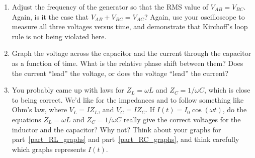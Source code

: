 \begin{enumerate}[wide]
\item Adjust the frequency of the generator so that the RMS value of $V_{AB} = V_{BC}$.   Again, is it the case that $V_{AB} + V_{BC} = V_{AC}$?  Again, use your oscilloscope to measure all three voltages versus time, and demonstrate that Kirchoff's loop rule is not being violated here.  

\item Graph the voltage across the capacitor and the current through the capacitor as a function of time.  What is the relative phase shift between them?  Does the current ``lead'' the voltage, or does the voltage ``lead'' the current? \label{part_RC_graphs}

\vfill

\item You probably came up with laws for $Z_L = \omega L$ and $Z_C = 1/ \omega C$, which is close to being correct.  We'd like for the impedances   and   to follow something like Ohm's law, where $V_L = I Z_L$, and $V_C = I Z_C$.  If  $I(t) = I_0 \cos(\omega t)$, do the equations $Z_L = \omega L$ and $Z_C = 1/ \omega C$ really give the correct voltages for the inductor and the capacitor?  Why not?  Think about your graphs for part~\ref{part_RL_graphs} and part~\ref{part_RC_graphs}, and think carefully which graphs represents $I(t)$.

\end{enumerate}





